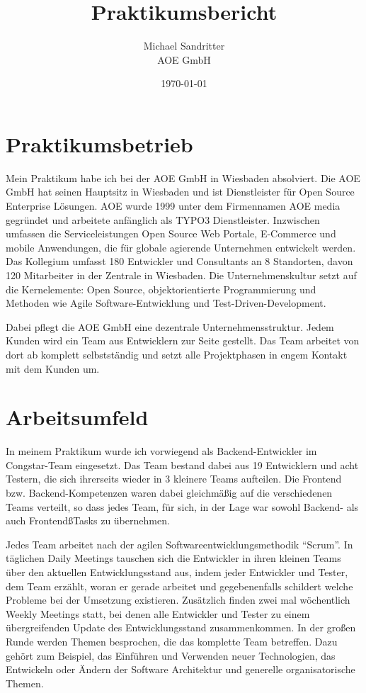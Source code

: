 \documentclass[11pt,a4paper]{article} %
\title{Praktikumsbericht}
\author{Michael Sandritter \\ AOE GmbH}
\date{\today}
\begin{document}
\maketitle %


\newpage %

\section{Praktikumsbetrieb} \label{sec:betrieb} 

Mein Praktikum habe ich bei der AOE GmbH in Wiesbaden absolviert. 
Die AOE GmbH hat seinen Hauptsitz in Wiesbaden und ist Dienstleister für Open Source Enterprise Lösungen. 
AOE wurde 1999 unter dem Firmennamen AOE media gegründet und arbeitete anfänglich als TYPO3 Dienstleister. 
Inzwischen umfassen die Serviceleistungen Open Source Web Portale, E-Commerce und mobile Anwendungen, 
die für globale agierende Unternehmen entwickelt werden. 
Das Kollegium umfasst 180 Entwickler und Consultants an 8 Standorten, davon 120 Mitarbeiter in der Zentrale in Wiesbaden. 
Die Unternehmenskultur setzt auf die Kernelemente: Open Source, objektorientierte Programmierung und Methoden 
wie Agile Software-Entwicklung und Test-Driven-Development. 

Dabei pflegt die AOE GmbH eine dezentrale Unternehmensstruktur. Jedem Kunden wird ein Team aus Entwicklern zur Seite gestellt. 
Das Team arbeitet von dort ab komplett selbstständig und setzt alle Projektphasen in engem Kontakt mit dem Kunden um.

\section{Arbeitsumfeld} \label{sec:umfeld}

In meinem Praktikum wurde ich vorwiegend als Backend-Entwickler im Congstar-Team eingesetzt. 
Das Team bestand dabei aus 19 Entwicklern und acht Testern, die sich ihrerseits wieder in 3 kleinere Teams aufteilen. 
Die Frontend bzw. Backend-Kompetenzen waren dabei gleichmäßig auf die verschiedenen Teams verteilt,
 so dass jedes Team, für sich, in der Lage war sowohl Backend- als auch FrontendßTasks zu übernehmen.

Jedes Team arbeitet nach der agilen Softwareentwicklungsmethodik “Scrum”. 
In täglichen Daily Meetings tauschen sich die Entwickler in ihren kleinen Teams über den aktuellen Entwicklungsstand aus, 
indem jeder Entwickler und Tester, dem Team erzählt, woran er gerade arbeitet und gegebenenfalls 
schildert welche Probleme bei der Umsetzung existieren.
Zusätzlich finden zwei mal wöchentlich Weekly Meetings statt, 
bei denen alle Entwickler und Tester zu einem übergreifenden Update des Entwicklungsstand zusammenkommen. 
In der großen Runde werden Themen besprochen, die das komplette Team betreffen. 
Dazu gehört zum Beispiel, das Einführen und Verwenden neuer Technologien, das Entwickeln oder 
Ändern der Software Architektur und generelle organisatorische Themen.
\end{document}
